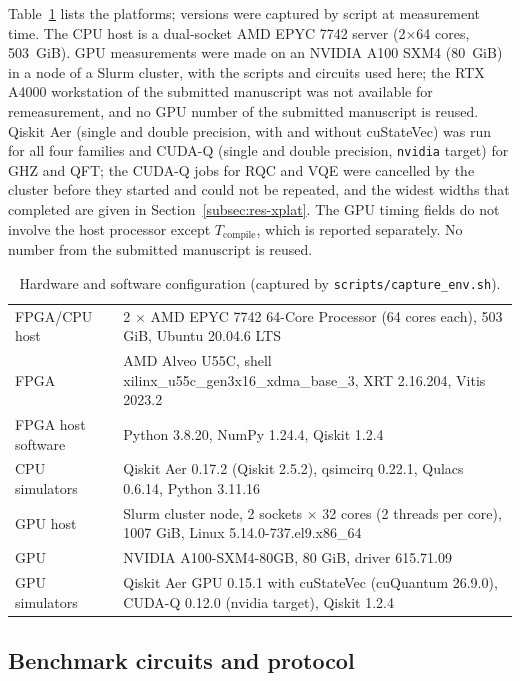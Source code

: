 \documentclass[pdflatex,sn-mathphys-num]{sn-jnl}
\theoremstyle{thmstyleone}
\theoremstyle{thmstylethree}
\begin{document}
Table~\ref{tab:hwconfig} lists the platforms; versions were captured by script at measurement time. The CPU host is a dual-socket AMD EPYC 7742 server (2$\times$64 cores, 503~GiB). GPU measurements were made on an NVIDIA A100 SXM4 (80~GiB) in a node of a Slurm cluster, with the scripts and circuits used here; the RTX A4000 workstation of the submitted manuscript was not available for remeasurement, and no GPU number of the submitted manuscript is reused. Qiskit Aer (single and double precision, with and without cuStateVec) was run for all four families and CUDA-Q (single and double precision, \texttt{nvidia} target) for GHZ and QFT; the CUDA-Q jobs for RQC and VQE were cancelled by the cluster before they started and could not be repeated, and the widest widths that completed are given in Section~\ref{subsec:res-xplat}. The GPU timing fields do not involve the host processor except $T_\mathrm{compile}$, which is reported separately. No number from the submitted manuscript is reused.

\begin{table}
\centering
\caption{Hardware and software configuration (captured by \texttt{scripts/capture\_env.sh}).}\label{tab:hwconfig}
\small
\begin{tabular}{p{2.6cm}p{9.0cm}}
\toprule
FPGA/CPU host & 2 $\times$ AMD EPYC 7742 64-Core Processor (64 cores each), 503 GiB, Ubuntu 20.04.6 LTS \\
FPGA & AMD Alveo U55C, shell xilinx\_u55c\_gen3x16\_xdma\_base\_3, XRT 2.16.204, Vitis 2023.2 \\
FPGA host software & Python 3.8.20, NumPy 1.24.4, Qiskit 1.2.4 \\
CPU simulators & Qiskit Aer 0.17.2 (Qiskit 2.5.2), qsimcirq 0.22.1, Qulacs 0.6.14, Python 3.11.16 \\
GPU host & Slurm cluster node, 2 sockets $\times$ 32 cores (2 threads per core), 1007 GiB, Linux 5.14.0-737.el9.x86\_64 \\
GPU & NVIDIA A100-SXM4-80GB, 80 GiB, driver 615.71.09 \\
GPU simulators & Qiskit Aer GPU 0.15.1 with cuStateVec (cuQuantum 26.9.0), CUDA-Q 0.12.0 (nvidia target), Qiskit 1.2.4 \\
\bottomrule
\end{tabular}
\end{table}

\subsection{Benchmark circuits and protocol}\label{subsec:protocol}
\end{document}
